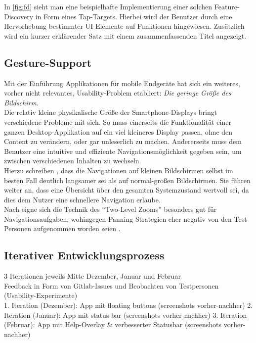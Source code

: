 In \autoref{fig:fd} sieht man eine beispielhafte Implementierung einer solchen Feature-Discovery in Form eines Tap-Targets.
Hierbei wird der Benutzer durch eine Hervorhebung bestimmter UI-Elemente auf Funktionen hingewiesen. 
Zusätzlich wird ein kurzer erklärender Satz mit einem zusammenfassenden Titel angezeigt. \\

\subsection{Gesture-Support}

Mit der Einführung Applikationen für mobile Endgeräte hat sich ein weiteres, vorher nicht relevantes, Usability-Problem etabliert: 
\emph{Die geringe Größe des Bildschirm}. \\

Die relativ kleine physikalische Größe der Smartphone-Displays bringt verschiedene Probleme mit sich. 
So muss einerseits die Funktionalität einer ganzen Desktop-Applikation auf ein viel kleineres Display passen, ohne den Content zu verändern, oder gar unleserlich zu machen.
Andererseits muss dem Benutzer eine intuitive und effiziente Navigationsmöglichkeit gegeben sein, um zwischen verschiedenen Inhalten zu wechseln. \\

Hierzu schreiben \citeauthor{Gutwin04}, dass die Navigationen auf kleinen Bildschirmen selbst im besten Fall deutlich langsamer sei als auf normal-großen Bildschirmen.
Sie führen weiter an, dass eine Übersicht über den gesamten Systemzustand wertvoll sei, da dies dem Nutzer eine schnellere Navigation erlaube. \\
Nach \citeauthor{Gutwin04} eigne sich die Technik des ``Two-Level Zooms'' besonders gut für Navigationsaufgaben, wohingegen Panning-Strategien eher negativ von den Test-Personen aufgenommen worden seien \citep[Seite 8]{Gutwin04}.  


\subsection{Iterativer Entwicklungsprozess}
3 Iterationen jeweils Mitte Dezember, Januar und Februar \\
Feedback in Form von Gitlab-Issues und Beobachten von Testpersonen (Usability-Experimente) \\
1. Iteration (Dezember): App mit floating buttons (screenshots vorher-nachher)
2. Iteration (Januar): App mit status bar (screenshots vorher-nachher)
3. Iteration (Februar): App mit Help-Overlay \& verbesserter Statusbar (screenshots vorher-nachher)

